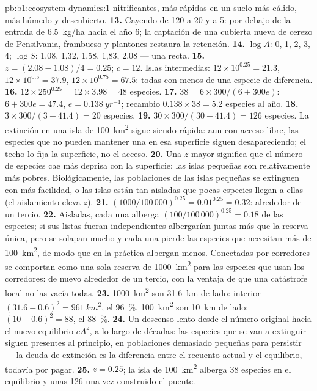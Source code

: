 \begin{solution}{pb:b1:ecosystem-dynamics:1}
nitrificantes, más rápidas en un suelo más cálido, más húmedo y descubierto.
\textbf{13.} Cayendo de \num{120} a \num{20} y a \num{5}: por debajo de la
entrada de \qty{6.5}{kg/ha} hacia el año 6; la captación de una cubierta
nueva de cerezo de Pensilvania, frambueso y plantones restaura la retención.
\textbf{14.} $\log A$: 0, 1, 2, 3, 4; $\log S$: 1,08, 1,32, 1,58,
1,83, 2,08 --- una recta.
\textbf{15.} $z = (2.08 - 1.08)/4 = 0.25$; $c = 12$. Islas intermedias:
$12\times 10^{0.25} = 21.3$, $12\times 10^{0.5} = 37.9$, $12\times
10^{0.75} = 67.5$: todas con menos de una especie de diferencia.
\textbf{16.} $12\times 250^{0.25} = 12\times 3.98 = 48$ especies.
\textbf{17.} $38 = 6\times 300/(6 + 300e)$: $6 + 300e = 47.4$, $e =
\qty{0.138}{yr^{-1}}$; recambio $0.138\times 38 = 5.2$ especies al año.
\textbf{18.} $3\times 300/(3 + 41.4) = 20$ especies.
\textbf{19.} $30\times 300/(30 + 41.4) = 126$ especies. La extinción en una
isla de \qty{100}{km^2} sigue siendo rápida: aun con acceso libre, las
especies que no pueden mantener una  en esa superficie siguen
desapareciendo; el techo lo fija la superficie, no el acceso.
\textbf{20.} Una $z$ mayor significa que el número de especies cae más
deprisa con la superficie: las islas pequeñas son relativamente más pobres.
Biológicamente, las poblaciones de las islas pequeñas se extinguen con más
facilidad, o las islas están tan aisladas que pocas especies llegan a ellas
(el aislamiento eleva $z$).
\textbf{21.} $(1000/100\,000)^{0.25} = 0.01^{0.25} = 0.32$: alrededor de un
tercio.
\textbf{22.} Aisladas, cada una alberga $(100/100\,000)^{0.25} = 0.18$ de
las especies; si sus listas fueran independientes albergarían juntas más que
la reserva única, pero se solapan mucho y cada una pierde las especies que
necesitan más de \qty{100}{km^2}, de modo que en la práctica albergan menos.
Conectadas por corredores se comportan como una sola reserva de
\qty{1000}{km^2} para las especies que usan los corredores: de nuevo
alrededor de un tercio, con la ventaja de que una catástrofe local no las
vacía todas.
\textbf{23.} \qty{1000}{km^2} son \qty{31.6}{km} de lado: interior
$(31.6 - 0.6)^2 = \qty{961}{km^2}$, el \qty{96}{\%}. \qty{100}{km^2} son
\qty{10}{km} de lado: $(10 - 0.6)^2 = 88$, el \qty{88}{\%}.
\textbf{24.} Un descenso lento desde el número original hacia el nuevo
equilibrio $cA^z$, a lo largo de décadas: las especies que se van a extinguir
siguen presentes al principio, en poblaciones demasiado pequeñas para
persistir --- la deuda de extinción es la diferencia entre el recuento
actual y el equilibrio, todavía por pagar.
\textbf{25.} $z = 0.25$; la isla de \qty{100}{km^2} alberga \num{38}
especies en el equilibrio y unas \num{126} una vez construido el puente.
\end{solution}
